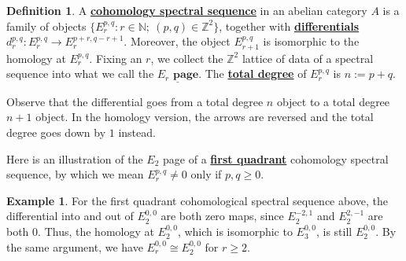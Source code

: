 \documentclass{article}
\theoremstyle{definition}
\theoremstyle{definition}
\theoremstyle{definition}
\theoremstyle{definition}
\newtheorem{definition}{Definition}[theorem]
\theoremstyle{definition}
\theoremstyle{definition}
\newtheorem{example}{Example}[theorem]
\begin{document}
\begin{tcolorbox}[colback=purple!5!white,colframe=purple!75!black]
\begin{definition}
A \underline{\textbf{cohomology spectral sequence}} in an abelian category $A$ is a family of objects $\{E_r^{p,q}: r\in \mathbb{N}; \ (p,q)\in \mathbb{Z}^2\}$, together with \underline{\textbf{differentials}} $d_r^{p,q}: E_r^{p,q}\to E_r^{p+r,q-r+1}$. Moreover, the object $E_{r+1}^{p,q}$ is isomorphic to the homology at $E_r^{p,q}$. Fixing an $r$, we collect the $\mathbb{Z}^2$ lattice of data of a spectral sequence into what we call the $\underline{ E_r \textbf{ page}}$. The \underline{\textbf{total degree}} of $E_r^{p,q}$ is $n:=p+q$. 
\end{definition}
\end{tcolorbox}
Observe that the differential goes from a total degree $n$ object to a total degree $n+1$ object. In the homology version, the arrows are reversed and the total degree goes down by $1$ instead. 


Here is an illustration of the $E_2$ page of a \underline{\textbf{first quadrant}} cohomology spectral sequence, by which we mean $E_r^{p,q}\neq 0$ only if $p,q\geq 0$. 



\begin{tcolorbox}[colback=yellow!5!white,colframe=yellow!30!white]
\begin{example}
	For the first quadrant cohomological spectral sequence above, the differential into and out of $E_2^{0,0}$ are both zero maps, since $E_2^{-2,1}$ and $E_2^{2,-1}$ are both $0$. Thus, the homology at $E_2^{0,0}$, which is isomorphic to $E_3^{0,0}$, is still $E_2^{0,0}$. By the same argument, we have $E_r^{0,0}\cong E_2^{0,0}$ for $r\geq 2$. 
\end{example}
\end{tcolorbox}
\end{document}
